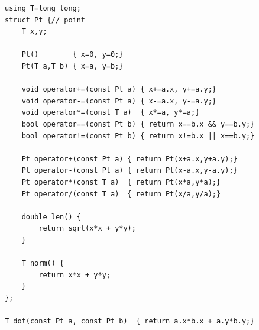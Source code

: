 \begin{lstlisting}[caption=2D vector]
using T=long long;
struct Pt {// point
    T x,y;

    Pt()        { x=0, y=0;}
    Pt(T a,T b) { x=a, y=b;}

    void operator+=(const Pt a) { x+=a.x, y+=a.y;}
    void operator-=(const Pt a) { x-=a.x, y-=a.y;}
    void operator*=(const T a)  { x*=a, y*=a;}
    bool operator==(const Pt b) { return x==b.x && y==b.y;}
    bool operator!=(const Pt b) { return x!=b.x || x==b.y;}

    Pt operator+(const Pt a) { return Pt(x+a.x,y+a.y);}
    Pt operator-(const Pt a) { return Pt(x-a.x,y-a.y);}
    Pt operator*(const T a)  { return Pt(x*a,y*a);}
    Pt operator/(const T a)  { return Pt(x/a,y/a);}

    double len() {
        return sqrt(x*x + y*y);
    }

    T norm() {
        return x*x + y*y;
    }
};

T dot(const Pt a, const Pt b)  { return a.x*b.x + a.y*b.y;}
\end{lstlisting}

